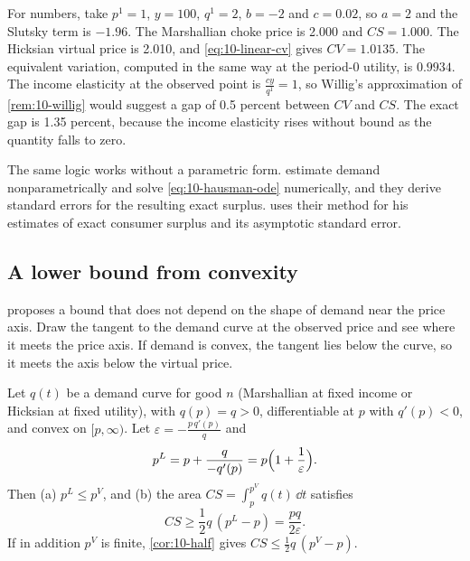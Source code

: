 \begin{example}
For numbers, take $p^1 = 1$, $y = 100$, $q^1 = 2$, $b = -2$ and $c = 0.02$, so $a = 2$ and the Slutsky term is
$-1.96$. The Marshallian choke price is 2.000 and $CS = 1.000$. The Hicksian virtual price is 2.010, and
\eqref{eq:10-linear-cv} gives $CV = 1.0135$. The equivalent variation, computed in the same way at the
period-0 utility, is $0.9934$. The income elasticity at the observed point is $\frac{cy}{q^1} = 1$, so
Willig's approximation of \cref{rem:10-willig} would suggest a gap of 0.5 percent between $CV$ and $CS$. The
exact gap is 1.35 percent, because the income elasticity rises without bound as the quantity falls to zero.
\end{example}

The same logic works without a parametric form. \citet{HausmanNewey1995} estimate demand nonparametrically and
solve \eqref{eq:10-hausman-ode} numerically, and they derive standard errors for the resulting exact surplus.
\citet[n.~24]{Hausman1997} uses their method for his estimates of exact consumer surplus and its asymptotic
standard error.

\subsection{A lower bound from convexity}\label{sec:10-tangent}

\citet[p.~228]{Hausman1997} proposes a bound that does not depend on the shape of demand near the price axis.
Draw the tangent to the demand curve at the observed price and see where it meets the price axis. If demand is
convex, the tangent lies below the curve, so it meets the axis below the virtual price.

\begin{proposition}\label{prop:10-tangent}
Let $q(t)$ be a demand curve for good $n$ (Marshallian at fixed income or Hicksian at fixed utility), with
$q(p) = q > 0$, differentiable at $p$ with $q'(p) < 0$, and convex on $[p,\infty)$. Let
$\varepsilon = -\frac{p\,q'(p)}{q}$ and
\begin{equation}\label{eq:10-pL}
  p^L = p + \frac{q}{-q'(p)} = p\Bigl(1 + \frac{1}{\varepsilon}\Bigr).
\end{equation}
Then (a) $p^L \le p^V$, and (b) the area $CS = \int_p^{p^V}q(t)\,\dd t$ satisfies
\begin{equation}\label{eq:10-tangent-cs}
  CS \ge \frac{1}{2}q\,(p^L - p) = \frac{pq}{2\varepsilon}.
\end{equation}
If in addition $p^V$ is finite, \cref{cor:10-half} gives $CS \le \frac{1}{2}q\,(p^V - p)$.
\end{proposition}

